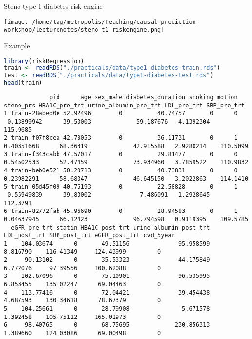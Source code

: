 \documentclass{beamer}\usepackage{listings}
\begin{document}
\begin{frame}[label={sec:org4f48961}]{Steno type 1 diabetes risk engine}
\begin{center}
\texttt{[image: /home/tag/metropolis/Teaching/causal-prediction-workshop/lecturenotes/steno-t1-riskengine.png]}
\end{center} 
\end{frame}
\begin{frame}[label={sec:orgf05d4f4},fragile,shrink=25]{Example}
 \begin{lstlisting}[language=r,numbers=none,otherkeywords={}, deletekeywords={}]
library(riskRegression)
train <- readRDS("./practicals/data/type1-diabetes-train.rds")
test <- readRDS("./practicals/data/type1-diabetes-test.rds")
head(train)
\end{lstlisting}
\pause
{}
\label{}
\begin{verbatim}
             pid      age sex_male diabetes_duration smoking motion   steno_prs HBA1C_pre_trt urine_albumin_pre_trt LDL_pre_trt SBP_pre_trt
1 train-28abed0e 52.92496        0          40.74757       0      0 -0.13899942      39.53003             59.187676   4.1392304    115.9685
2 train-f07f8cea 42.70053        0          36.11731       0      1  0.40351668      68.36319             42.915588   2.9280214    110.5099
3 train-f343cabb 47.57017        0          29.81477       0      0  0.54502533      52.47459             73.934960   3.7859522    110.9832
4 train-beb0e521 50.20713        0          40.73831       0      0  0.23982291      58.68347             46.645150   3.2022863    114.1410
5 train-05d45f09 40.76193        0          22.58828       0      1 -0.55949839      39.83002              7.486091   1.2928645    112.3791
6 train-82772fab 45.96690        0          28.94583       0      1  0.04637945      66.12423             96.794598   0.9119395    109.5785
  eGFR_pre_trt statin HBA1C_post_trt urine_albumin_post_trt LDL_post_trt SBP_post_trt eGFR_post_trt cvd_5year
1    104.03674      0       49.51156              95.958599     8.816790    116.41349     124.43999         0
2     90.13102      0       35.53323              44.175849     6.772076     97.39556     100.62088         0
3    102.67096      0       75.10901              96.535995     6.853455    135.02247      69.04463         0
4    113.77416      0       72.04421              39.454438     4.687593    130.34618      78.67379         0
5    104.25661      0       28.79908               5.671578     1.392458    105.75112     165.02973         0
6     98.40765      0       68.75695             230.856313     1.389660    124.03086      69.00498         0
\end{verbatim}
\end{frame}
\end{document}
